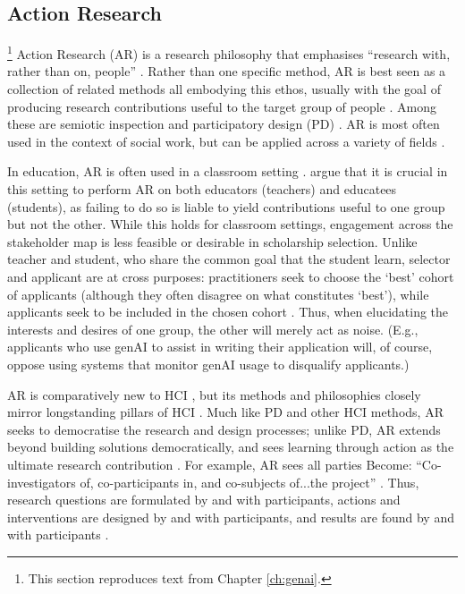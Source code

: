 \subsection{Action Research}\label{ssec:action_research}\footnote{This section reproduces text from Chapter \ref{ch:genai}.}
Action Research (AR) is a research philosophy that emphasises ``research with, rather than on, people'' \cite{bradbury_action_2003}. Rather than one specific method, AR is best seen as a collection of related methods all embodying this ethos, usually with the goal of producing research contributions useful to the target group of people \cite{lu_organizing_2023}. Among these are semiotic inspection \cite{DeSouza_Leitão_2009,Alvarado_Waern_2018} and participatory design  (PD) \cite{braun_using_2006,Griffiths_Johnson_Hartley_2007,blythe2014research,Knapp_Zeratzky_Kowitz_2016}. AR is most often used in the context of social work, but can be applied across a variety of fields \cite{dombrowski_social_2016,lu_organizing_2023}. 

In education, AR is often used in a classroom setting \cite{Mertler_2019}. \textcite{venn-wycherley_realities_2024} argue that it is crucial in this setting to perform AR on both educators (teachers) and educatees (students), as failing to do so is liable to yield contributions useful to one group but not the other. While this holds for classroom settings, engagement across the stakeholder map is less feasible or desirable in scholarship selection. Unlike teacher and student, who share the common goal that the student learn, selector and applicant are at cross purposes: practitioners seek to choose the `best' cohort of applicants (although they often disagree on what constitutes `best'), while applicants seek to be included in the chosen cohort \cite{bergman2021seven}. Thus, when elucidating the interests and desires of one group, the other will merely act as noise. (E.g., applicants who use genAI to assist in writing their application will, of course, oppose using systems that monitor genAI usage to disqualify applicants.)

AR is comparatively new to HCI \cite{Hayes_2011,lu_organizing_2023}, but its methods and philosophies closely mirror longstanding pillars of HCI \cite{Hayes_2011}. Much like PD and other HCI methods, AR seeks to democratise the research and design processes; unlike PD, AR extends beyond building solutions democratically, and sees learning through action as the ultimate research contribution \cite{Hayes_2011}. For example, AR sees all parties Become: ``Co-investigators of, co-participants in, and co-subjects of...the project'' \cite{Hayes_2011}.  Thus, research questions are formulated by and with participants, actions and interventions are designed by and with participants, and results are found by and with participants \cite{Hayes_2011}.

